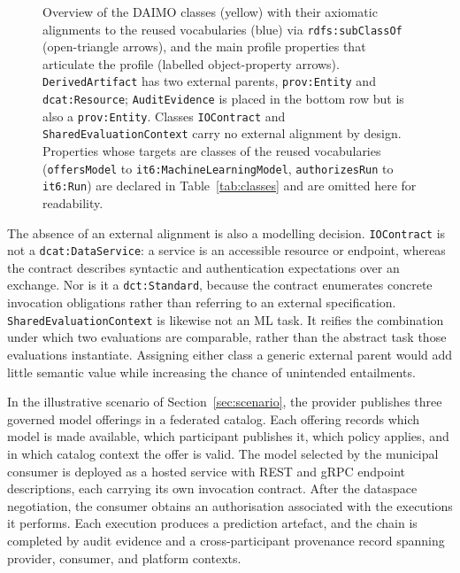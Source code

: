 \documentclass[11pt,a4paper]{article}
\newcommand{\code}[1]{\texttt{#1}}
\begin{document}
\begin{figure}[t]
\caption{Overview of the DAIMO classes (yellow) with their axiomatic alignments to the reused vocabularies (blue) via \code{rdfs:subClassOf} (open-triangle arrows), and the main profile properties that articulate the profile (labelled object-property arrows). \code{DerivedArtifact} has two external parents, \code{prov:Entity} and \code{dcat:Resource}; \code{AuditEvidence} is placed in the bottom row but is also a \code{prov:Entity}. Classes \code{IOContract} and \code{SharedEvaluationContext} carry no external alignment by design. Properties whose targets are classes of the reused vocabularies (\code{offersModel} to \code{it6:MachineLearningModel}, \code{authorizesRun} to \code{it6:Run}) are declared in Table~\ref{tab:classes} and are omitted here for readability.}
\label{fig:classes}
\end{figure}

The absence of an external alignment is also a modelling decision. \code{IOContract} is not a \code{dcat:DataService}: a service is an accessible resource or endpoint, whereas the contract describes syntactic and authentication expectations over an exchange. Nor is it a \code{dct:Standard}, because the contract enumerates concrete invocation obligations rather than referring to an external specification. \code{SharedEvaluationContext} is likewise not an ML task. It reifies the combination under which two evaluations are comparable, rather than the abstract task those evaluations instantiate. Assigning either class a generic external parent would add little semantic value while increasing the chance of unintended entailments.

In the illustrative scenario of Section~\ref{sec:scenario}, the provider publishes three governed model offerings in a federated catalog. Each offering records which model is made available, which participant publishes it, which policy applies, and in which catalog context the offer is valid. The model selected by the municipal consumer is deployed as a hosted service with REST and gRPC endpoint descriptions, each carrying its own invocation contract. After the dataspace negotiation, the consumer obtains an authorisation associated with the executions it performs. Each execution produces a prediction artefact, and the chain is completed by audit evidence and a cross-participant provenance record spanning provider, consumer, and platform contexts.
\end{document}

